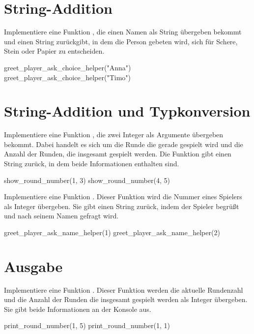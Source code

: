 \documentclass[a4paper, DIV = calc]{scrartcl}
\begin{document}
\section{String-Addition}
\begin{aufgabe} \noindent 
Implementiere eine Funktion , die einen Namen als String übergeben bekommt und einen String zurückgibt, in dem die Person gebeten wird, sich für Schere, Stein oder Papier zu entscheiden.
\begin{pyconsole}
greet_player_ask_choice_helper("Anna")
greet_player_ask_choice_helper("Timo")
\end{pyconsole}
\end{aufgabe}



\section{String-Addition und Typkonversion}

\begin{aufgabe} \noindent 
Implementiere eine Funktion , die zwei Integer als Argumente übergeben bekommt. Dabei handelt es sich um die Runde die gerade gespielt wird und die Anzahl der Runden, die insgesamt gespielt werden. Die Funktion gibt einen String zurück, in dem beide Informationen enthalten sind.
\begin{pyconsole}
show_round_number(1, 3)
show_round_number(4, 5)
\end{pyconsole}
\end{aufgabe}


\begin{aufgabe} \noindent 
Implementiere eine Funktion . Dieser Funktion wird die Nummer eines Spielers als Integer übergeben. Sie gibt einen String zurück, indem der Spieler begrüßt und nach seinem Namen gefragt wird.
\begin{pyconsole}
greet_player_ask_name_helper(1)
greet_player_ask_name_helper(2)
\end{pyconsole}
\end{aufgabe}

\section{Ausgabe}

\begin{aufgabe} \noindent 
Implementiere eine Funktion . Dieser Funktion werden die aktuelle Rundenzahl und die Anzahl der Runden die insgesamt gespielt werden als Integer übergeben. Sie gibt beide Informationen an der Konsole aus.
\begin{pyconsole}
print_round_number(1, 5)
print_round_number(1, 1)
\end{pyconsole}
\end{aufgabe}
\end{document}
